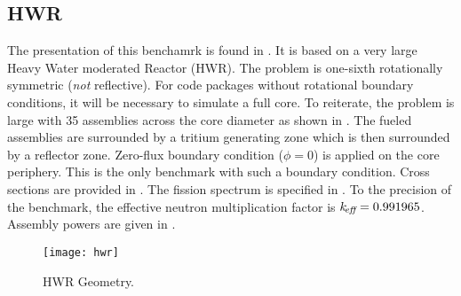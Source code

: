     \restoregeometry
    \pagestyle{plain}
    \thispagestyle{plain}
  \subsection{HWR}
    \label{sec:hwr}
    The presentation of this benchamrk is found in \cite{chao}. It is based on a
    very large Heavy Water moderated Reactor (HWR).  The problem is
    one-sixth rotationally symmetric (\textit{not} reflective). For code
    packages without rotational boundary conditions, it will be necessary to
    simulate a full core. To reiterate, the problem is large with 35 assemblies
    across the core diameter as shown in . The fueled
    assemblies are surrounded by a tritium generating zone which is then 
    surrounded by a reflector zone. Zero-flux boundary condition ($\phi = 0$) is
    applied on the core periphery. This is the only benchmark with such a
    boundary condition. Cross sections are provided in
    . The fission spectrum is specified in . To
    the precision of the benchmark, the effective neutron multiplication factor
    is $k_{\!\mbox{\scriptsize \em eff}} = 0.991965$. Assembly powers are given in .
    \begin{figure}
      \centering
      \texttt{[image: hwr]}
      \caption{HWR Geometry.}
      \label{fig:hwr_geom}
    \end{figure}
